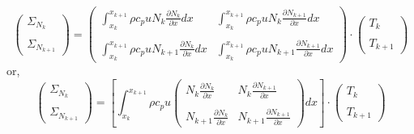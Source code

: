 \[
\left(
\begin{array}{c}
{\Sigma}_{N_k}  \\ \\ {\Sigma}_{N_{k+1}}
\end{array}
\right)
\!=\!
\left(
\begin{array}{cc}
\int_{x_k}^{x_{k+1}} \rho c_p u N_k \frac{\partial  N_{k} }{\partial x} dx  & 
\int_{x_k}^{x_{k+1}} \rho c_p u N_k \frac{\partial  N_{k+1} }{\partial x} dx \\ \\
\int_{x_k}^{x_{k+1}} \rho c_p u N_{k+1} \frac{\partial  N_{k} }{\partial x} dx  & 
\int_{x_k}^{x_{k+1}} \rho c_p u N_{k+1} \frac{\partial  N_{k+1} }{\partial x} dx 
\end{array}
\right)
\!\cdot\!
\left(
\begin{array}{c}
{T}_k \\ \\
{T}_{k+1}
\end{array}
\right)
\]
or,
\[
\left(
\begin{array}{c}
{\Sigma}_{N_k} \\ \\ {\Sigma}_{N_{k+1}}
\end{array}
\right)
\!=\!
\left[
\int_{x_k}^{x_{k+1}}
\rho c_p u
\left(
\begin{array}{cc}
N_k \frac{\partial     N_{k} }{\partial x}   & 
N_k \frac{\partial     N_{k+1} }{\partial x}  \\ \\
N_{k+1} \frac{\partial N_{k} }{\partial x}   & 
N_{k+1} \frac{\partial N_{k+1} }{\partial x} 
\end{array}
\right)
dx
\right]
\cdot
\left(
\begin{array}{c}
{T}_k \\ \\ 
{T}_{k+1}
\end{array}
\right)
\]

